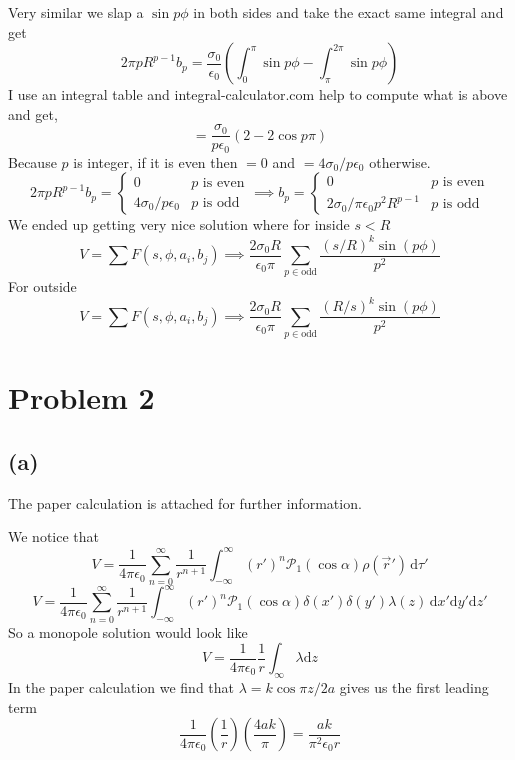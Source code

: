 \documentclass[letter, 10pts]{article}
\begin{document}
Very similar we slap a $\sin p \phi$ in both sides and take the exact same integral and get
\[
2 \pi p R^{p -1} b_p = 
\frac{\sigma_0}{\epsilon_0} 
\left(
\int_{0}^{ \pi } \sin p \phi 
- 
\int_{\pi }^{2 \pi }  \sin p \phi 
\right)
\]
I use an integral table and integral-calculator.com help to compute what is above and get, 
\[
= \frac{\sigma_0}{p \epsilon_0} (2  - 2 \cos p \pi)
\]
Because $p$ is integer, if it is even then $ = 0$ and $= 4 \sigma_0 / p \epsilon_0$ otherwise. 
\[
2  \pi p R^{p -1} b_p = 
\begin{cases}
	0 &p \text{ is even} \\ 
	4 \sigma_0 / p \epsilon_0 & p \text{ is odd}
\end{cases} \implies 
b_p = 
\begin{cases}
	0 &p \text{ is even} \\ 
	2 \sigma_0 / \pi \epsilon_0 p^2 R^{p  - 1 } & p \text{ is odd}
\end{cases} 
\] 
We ended up getting very nice solution where for inside $s < R$
\[\boxed{
V = \sum_{}^{} F(s, \phi, a_i, b_j) \implies \frac{2 \sigma_0 R}{\epsilon_0 \pi } 
\sum_{p \in \text{odd}} \frac{(s / R)^{k} \sin(p \phi)}{p^2}
}\] 
For outside
\[
	\boxed{
V = \sum_{}^{} F(s, \phi, a_i, b_j) \implies \frac{2 \sigma_0 R}{\epsilon_0 \pi } 
\sum_{p \in \text{odd}} \frac{(R / s)^{k} \sin(p \phi)}{p^2}
}\] 



\section*{Problem 2} 
\subsection*{(a)}
The paper calculation is attached for further information. 

We notice that 
\[
	V = \frac{1}{4 \pi \epsilon_0} 
	\sum_{n=0}^{\infty} \frac{1}{r^{n + 1}}
	\int_{-\infty}^{\infty} (r')^{n} \mathcal P_1(\cos \alpha) \rho(\vec{r}') \, \mathrm{d} \tau'  
\] 
\[
	V = \frac{1}{4 \pi \epsilon_0} 
	\sum_{n=0}^{\infty} \frac{1}{r^{n + 1}}
	\int_{-\infty}^{\infty} (r')^{n} \mathcal P_1(\cos \alpha) \delta(x') \delta(y') \lambda(z) \, \mathrm{d} x' \mathrm{d} y' \mathrm{d} z'
\] 
So a monopole solution would look like
\[
V = \frac{1}{4 \pi \epsilon_0}
\frac{1}{r} 
\int_{\infty}^{} \lambda \mathrm{d} z 
\] 
In the paper calculation we find that $\lambda = k \cos \pi z / 2 a$ gives us the first leading term 
\[
\boxed{
\frac{1}{4 \pi \epsilon_0} \left(\frac{1}{r}\right)\left(\frac{4 a k }{\pi}\right) = \frac{ak}{\pi ^2 \epsilon_0 r}
}
\] 
\end{document}
